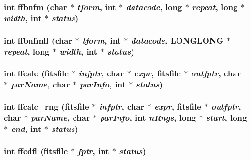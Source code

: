 \subsubsection{\setlength{\rightskip}{0pt plus 5cm}int ffbnfm (char $\ast$ {\em tform}, int $\ast$ {\em datacode}, long $\ast$ {\em repeat}, long $\ast$ {\em width}, int $\ast$ {\em status})}\label{src_2fitsio_8h_cfe4b7969d8e7484d15510380edd2b57}


\subsubsection{\setlength{\rightskip}{0pt plus 5cm}int ffbnfmll (char $\ast$ {\em tform}, int $\ast$ {\em datacode}, \bf{LONGLONG} $\ast$ {\em repeat}, long $\ast$ {\em width}, int $\ast$ {\em status})}\label{src_2fitsio_8h_63407aabf5d249931c496d2b4029a188}


\subsubsection{\setlength{\rightskip}{0pt plus 5cm}int ffcalc (\bf{fitsfile} $\ast$ {\em infptr}, char $\ast$ {\em expr}, \bf{fitsfile} $\ast$ {\em outfptr}, char $\ast$ {\em par\-Name}, char $\ast$ {\em par\-Info}, int $\ast$ {\em status})}\label{src_2fitsio_8h_c546ca394e9c86991b46a6f6c420f7bf}


\subsubsection{\setlength{\rightskip}{0pt plus 5cm}int ffcalc\_\-rng (\bf{fitsfile} $\ast$ {\em infptr}, char $\ast$ {\em expr}, \bf{fitsfile} $\ast$ {\em outfptr}, char $\ast$ {\em par\-Name}, char $\ast$ {\em par\-Info}, int {\em n\-Rngs}, long $\ast$ {\em start}, long $\ast$ {\em end}, int $\ast$ {\em status})}\label{src_2fitsio_8h_fb304389717fe2041f1b59c7acc85249}


\subsubsection{\setlength{\rightskip}{0pt plus 5cm}int ffcdfl (\bf{fitsfile} $\ast$ {\em fptr}, int $\ast$ {\em status})}\label{src_2fitsio_8h_e14237195c7eca6e7dd93690762d20db}


